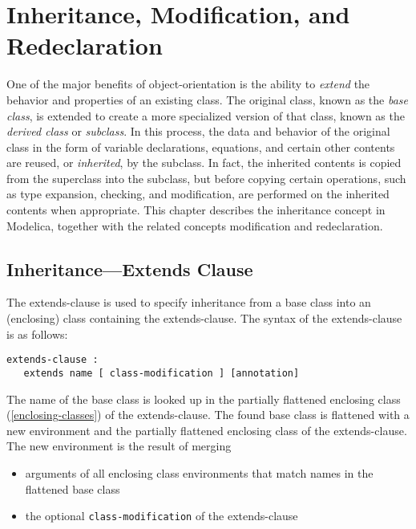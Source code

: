\chapter{Inheritance, Modification, and Redeclaration}

One of the major benefits of object-orientation is the ability to
\emph{extend} the behavior and properties of an existing class. The
original class, known as the \emph{base class}, is extended to create a
more specialized version of that class, known as the \emph{derived
class} or \emph{subclass}. In this process, the data and behavior of the
original class in the form of variable declarations, equations, and
certain other contents are reused, or \emph{inherited}, by the subclass.
In fact, the inherited contents is copied from the superclass into the
subclass, but before copying certain operations, such as type expansion,
checking, and modification, are performed on the inherited contents when
appropriate. This chapter describes the inheritance concept in Modelica,
together with the related concepts modification and redeclaration.

\section{Inheritance---Extends Clause}

The extends-clause is used to specify inheritance from a base class into
an (enclosing) class containing the extends-clause. The syntax of the
extends-clause is as follows:

\begin{lstlisting}[language=grammar]
extends-clause :
   extends name [ class-modification ] [annotation]
\end{lstlisting}
The name of the base class is looked up in the partially flattened
enclosing class (\autoref{enclosing-classes}) of the extends-clause. The found base
class is flattened with a new environment and the partially flattened
enclosing class of the extends-clause. The new environment is the result
of merging

\begin{itemize}
\item
  arguments of all enclosing class environments that match names in the
  flattened base class
\item
  the optional \lstinline[basicstyle=\ttfamily]!class-modification! of the extends-clause
\end{itemize}

